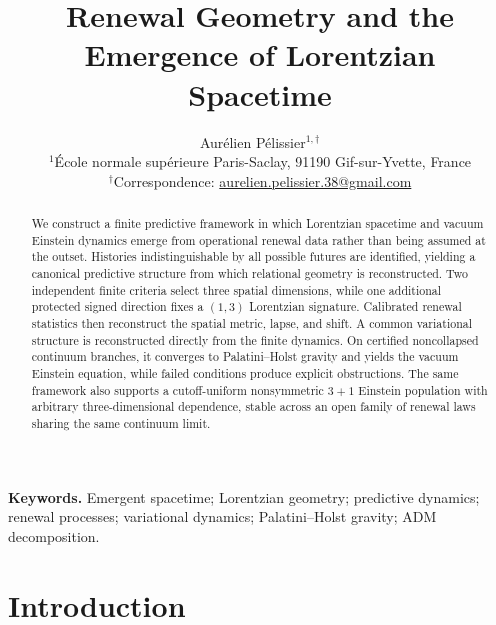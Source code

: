 \documentclass[11pt]{article}
\title{\textbf{Renewal Geometry and the Emergence of Lorentzian Spacetime}}
\author{%
  Aur\'elien P\'elissier$^{1,\dagger}$\\
  {\small $^{1}$\'Ecole normale sup\'erieure Paris-Saclay, 91190 Gif-sur-Yvette, France}\\[-0.25em]
  {\small $^{\dagger}$Correspondence: \href{mailto:aurelien.pelissier.38@gmail.com}{aurelien.pelissier.38@gmail.com}}%
}
\date{}
\theoremstyle{definition}
\theoremstyle{remark}
\begin{document}
\maketitle

\begin{abstract}
We construct a finite predictive framework in which Lorentzian spacetime and vacuum Einstein dynamics emerge from operational renewal data rather than being assumed at the outset. Histories indistinguishable by all possible futures are identified, yielding a canonical predictive structure from which relational geometry is reconstructed. Two independent finite criteria select three spatial dimensions, while one additional protected signed direction fixes a $(1,3)$ Lorentzian signature. Calibrated renewal statistics then reconstruct the spatial metric, lapse, and shift.
%
A common variational structure is reconstructed directly from the finite dynamics. On certified noncollapsed continuum branches, it converges to Palatini--Holst gravity and yields the vacuum Einstein equation, while failed conditions produce explicit obstructions. The same framework also supports a cutoff-uniform nonsymmetric \(3+1\) Einstein population with arbitrary three-dimensional dependence, stable across an open family of renewal laws sharing the same continuum limit.
\end{abstract}




\medskip
\noindent\textbf{Keywords.} Emergent spacetime; Lorentzian geometry; predictive dynamics; renewal processes; variational dynamics; Palatini--Holst gravity; ADM decomposition.
\setcounter{tocdepth}{2}


\section{Introduction}
\label{sec:introduction}
\end{document}
